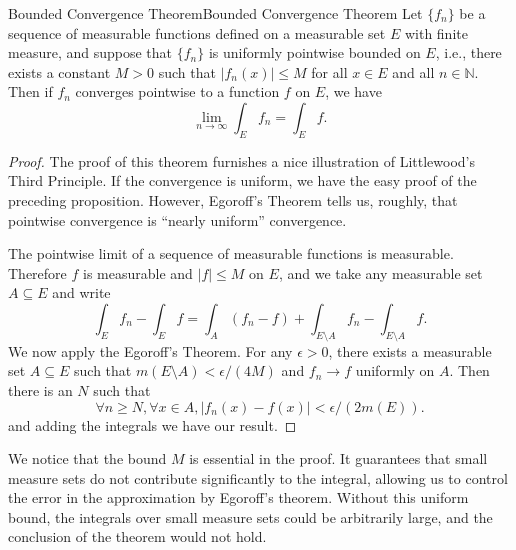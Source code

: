 \documentclass[../main.tex]{subfiles}
\begin{document}
\begin{theorem}{Bounded Convergence Theorem}{Bounded Convergence Theorem}
	Let $\{ f_n \}$ be a sequence of measurable functions defined on a measurable set $E$ with finite measure, and suppose that $\{ f_n \}$ is uniformly pointwise bounded on $E$, i.e., there exists a constant $M > 0$ such that $|f_n(x)| \leq M$ for all $x \in E$ and all $n \in \mathbb{N}$. Then if $f_n$ converges pointwise to a function $f$ on $E$, we have
	\begin{equation*}
		\lim_{n \to \infty} \int_E f_n = \int_E f.
	\end{equation*}
\end{theorem}
\begin{proof}
	The proof of this theorem furnishes a nice illustration of Littlewood's Third Principle. If the convergence is uniform, we have the easy proof of the preceding proposition. However, Egoroff's Theorem tells us, roughly, that pointwise convergence is ``nearly uniform'' convergence.

	The pointwise limit of a sequence of measurable functions is measurable. Therefore $f$ is measurable and $|f| \leq M$ on $E$, and we take any measurable set $A \subseteq E$ and write
	\begin{equation*}
		\int_E f_n - \int_E f = \int_A (f_n - f) + \int_{E \setminus A} f_n - \int_{E \setminus A} f.
	\end{equation*}
	We now apply the Egoroff's Theorem. For any $\epsilon > 0$, there exists a measurable set $A \subseteq E$ such that $m(E \setminus A) < \epsilon / (4M)$ and $f_n \to f$ uniformly on $A$. Then there is an $N$ such that
	\begin{equation*}
		\forall n \geq N, \forall x \in A, |f_n(x) - f(x)| < \epsilon / (2 m(E)).
	\end{equation*}
	and adding the integrals we have our result.
\end{proof}

\begin{remark}
	We notice that the bound $M$ is essential in the proof. It guarantees that small measure sets do not contribute significantly to the integral, allowing us to control the error in the approximation by Egoroff's theorem. Without this uniform bound, the integrals over small measure sets could be arbitrarily large, and the conclusion of the theorem would not hold.
\end{remark}
\end{document}

